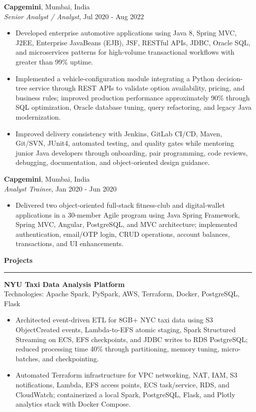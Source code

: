 \documentclass[10pt,letterpaper]{article}
\newcommand{\ressection}[1]{%
  \vspace{3pt}\par\textbf{#1}\par\vspace{1pt}\hrule\vspace{2pt}
}
\begin{document}
\textbf{Capgemini}, Mumbai, India\\
\textit{Senior Analyst / Analyst}, Jul 2020 - Aug 2022
\begin{itemize}
  \item Developed enterprise automotive applications using Java 8, Spring MVC, J2EE, Enterprise JavaBeans (EJB), JSF, RESTful APIs, JDBC, Oracle SQL, and microservices patterns for high-volume transactional workflows with greater than 99\% uptime.
  \item Implemented a vehicle-configuration module integrating a Python decision-tree service through REST APIs to validate option availability, pricing, and business rules; improved production performance approximately 90\% through SQL optimization, Oracle database tuning, query refactoring, and legacy Java modernization.
  \item Improved delivery consistency with Jenkins, GitLab CI/CD, Maven, Git/SVN, JUnit4, automated testing, and quality gates while mentoring junior Java developers through onboarding, pair programming, code reviews, debugging, documentation, and object-oriented design guidance.
\end{itemize}

\textbf{Capgemini}, Mumbai, India\\
\textit{Analyst Trainee}, Jan 2020 - Jun 2020
\begin{itemize}
  \item Delivered two object-oriented full-stack fitness-club and digital-wallet applications in a 30-member Agile program using Java Spring Framework, Spring MVC, Angular, PostgreSQL, and MVC architecture; implemented authentication, email/OTP login, CRUD operations, account balances, transactions, and UI enhancements.
\end{itemize}

\ressection{Projects}

\textbf{NYU Taxi Data Analysis Platform}\\
Technologies: Apache Spark, PySpark, AWS, Terraform, Docker, PostgreSQL, Flask
\begin{itemize}
  \item Architected event-driven ETL for 8GB+ NYC taxi data using S3 ObjectCreated events, Lambda-to-EFS atomic staging, Spark Structured Streaming on ECS, EFS checkpoints, and JDBC writes to RDS PostgreSQL; reduced processing time 40\% through partitioning, memory tuning, micro-batches, and checkpointing.
  \item Automated Terraform infrastructure for VPC networking, NAT, IAM, S3 notifications, Lambda, EFS access points, ECS task/service, RDS, and CloudWatch; containerized a local Spark, PostgreSQL, Flask, and Plotly analytics stack with Docker Compose.
\end{itemize}
\end{document}
